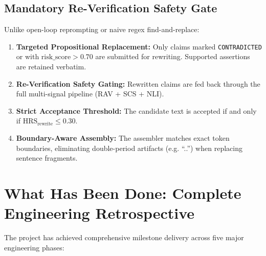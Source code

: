 \documentclass[11pt,a4paper]{article}
\begin{document}
\subsection{Mandatory Re-Verification Safety Gate}
Unlike open-loop reprompting or naive regex find-and-replace:
\begin{enumerate}[leftmargin=*]
    \item \textbf{Targeted Propositional Replacement:} Only claims marked \texttt{CONTRADICTED} or with $\text{risk\_score} > 0.70$ are submitted for rewriting. Supported assertions are retained verbatim.
    \item \textbf{Re-Verification Safety Gating:} Rewritten claims are fed back through the full multi-signal pipeline (RAV + SCS + NLI).
    \item \textbf{Strict Acceptance Threshold:} The candidate text is accepted if and only if $\text{HRS}_{\text{rewrite}} \le 0.30$.
    \item \textbf{Boundary-Aware Assembly:} The assembler matches exact token boundaries, eliminating double-period artifacts (e.g. ``..'') when replacing sentence fragments.
\end{enumerate}

\section{What Has Been Done: Complete Engineering Retrospective}

The project has achieved comprehensive milestone delivery across five major engineering phases:
\end{document}
